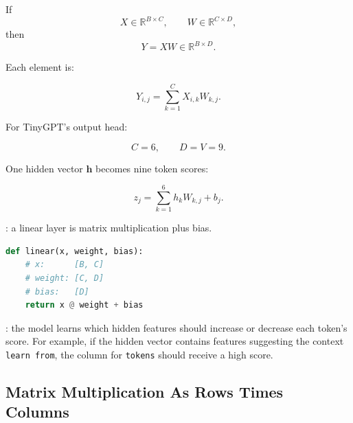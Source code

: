 If
\[
X \in \mathbb{R}^{B \times C},
\qquad
W \in \mathbb{R}^{C \times D},
\]
then
\[
Y = XW \in \mathbb{R}^{B \times D}.
\]

Each element is:

\[
Y_{i,j} = \sum_{k=1}^{C} X_{i,k} W_{k,j}.
\]

For TinyGPT's output head:

\[
C=6,\qquad D=V=9.
\]

One hidden vector \(\mathbf{h}\) becomes nine token scores:

\[
z_j = \sum_{k=1}^{6} h_k W_{k,j} + b_j.
\]

\begin{center}
\end{center}

: a linear layer is matrix multiplication plus bias.

\begin{lstlisting}[language=Python]
def linear(x, weight, bias):
    # x:      [B, C]
    # weight: [C, D]
    # bias:   [D]
    return x @ weight + bias
\end{lstlisting}

: the model learns which hidden features should increase or decrease each token's score. For example, if the hidden vector contains features suggesting the context \texttt{learn from}, the column for \texttt{tokens} should receive a high score.

\subsection{Matrix Multiplication As Rows Times Columns}

